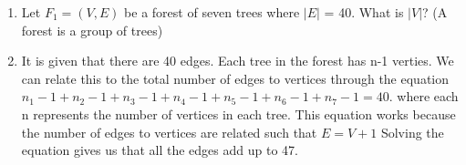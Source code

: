 \documentclass[letterpaper,11pt]{article}
\begin{document}
\begin{enumerate}
    \item Let $F_1 = (V, E)$ be a forest of seven trees where $\left\lvert E \right\rvert$  = 40. What is $\left\lvert V \right\rvert$? (A forest is a group of trees)
    \item[] It is given that there are 40 edges. Each tree in the forest has n-1 verties. We can relate this to the total number of edges to vertices through the equation $n_1-1+n_2-1+n_3-1+n_4-1+n_5-1+n_6-1+n_7-1 = 40.$ where each n represents the number of vertices in each tree. This equation works because the number of edges to vertices are related such that $E=V+1$ Solving the equation gives us that all the edges add up to 47.

\end{enumerate}
\end{document}
